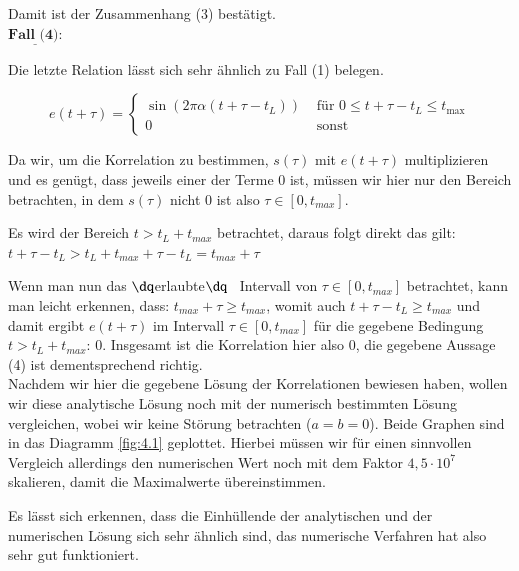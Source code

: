 \documentclass[ngerman]{scrartcl}
\begin{document}
Damit ist der Zusammenhang (3) bestätigt.\\


$\underline{\textbf{Fall (4):}}$

Die letzte Relation lässt sich sehr ähnlich zu Fall (1) belegen.


\begin{equation*}
e(t+\tau)=\left\{\begin{array}{ll}
\sin (2 \pi \alpha (t+\tau-t_L)) & \text { für } 0 \leq t+\tau-t_L \leq t_{\max } \\
0 & \text { sonst }
\end{array}\right.
\end{equation*}

Da wir, um die Korrelation zu bestimmen, $s(\tau)$ mit $e(t+\tau)$ multiplizieren und es genügt, dass jeweils einer der Terme 0 ist, müssen wir hier nur den Bereich betrachten, in dem $s(\tau)$ nicht 0 ist also $\tau \in [0,t_{max}]$.

Es wird der Bereich $t>t_L+t_{max}$ betrachtet, daraus folgt direkt das gilt: \\
$t+\tau-t_L>t_L+t_{max}+\tau-t_L=t_{max}+\tau$

Wenn man nun das $\dq$erlaubte$\dq$ ~Intervall von $\tau \in [0,t_{max}]$ betrachtet, kann man leicht erkennen, dass:
$t_{max}+\tau \geq t_{max}$, womit auch $t+\tau-t_L \geq t_{max}$ und damit ergibt $e(t+\tau)$ im Intervall $\tau \in [0,t_{max}]$ für die gegebene Bedingung $t>t_L+t_{max}$: 0. Insgesamt ist die Korrelation hier also 0, die gegebene Aussage (4) ist dementsprechend richtig.\\


Nachdem wir hier die gegebene Lösung der Korrelationen bewiesen haben, wollen wir diese analytische Lösung noch mit der numerisch bestimmten Lösung vergleichen, wobei wir keine Störung betrachten ($a=b=0$). Beide Graphen sind in das Diagramm \ref{fig:4.1} geplottet. Hierbei müssen wir für einen sinnvollen Vergleich allerdings den numerischen Wert noch mit dem Faktor $4,5 \cdot 10^7$ skalieren, damit die Maximalwerte übereinstimmen.


Es lässt sich erkennen, dass die Einhüllende der analytischen und der numerischen Lösung sich sehr ähnlich sind, das numerische Verfahren hat also sehr gut funktioniert.
\end{document}
